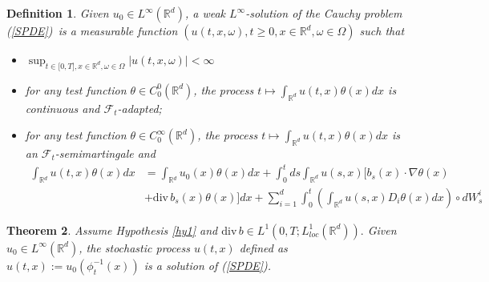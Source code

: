 \documentclass[a4paper,10pt]{article}
\newtheorem{theorem}{Theorem}
\newtheorem{definition}[theorem]{Definition}
\newtheorem{proposition}[theorem]{Proposition}
\begin{document}
\begin{definition}
\label{def solution}Given $u_{0}\in L^{\infty}({\mathbb{R}}^{d})$, a weak
$L^{\infty}$-solution of the Cauchy problem (\ref{SPDE})\ is a measurable
function $(u(t,x,\omega),t\geq0,x\in{\mathbb{R}}^{d},\omega\in\Omega)$ such that

\begin{itemize}
\item [(i)]$\sup_{t\in\lbrack0,T],x\in{\mathbb{R}}^{d},\omega\in\Omega}\left|
u(t,x,\omega)\right|  <\infty$

\item[(ii)] for any test function $\theta\in C_{0}^{0}({}{\mathbb{R}}^{d})$,
the process $t\mapsto\int_{{}{\mathbb{R}}^{d}}u(t,x)\theta(x)dx$ is continuous
and ${}\mathcal{F}_{t}$-adapted;

\item[(iii)] for any test function $\theta\in C_{0}^{\infty}({}{\mathbb{R}%
}^{d})$, the process $t\mapsto\int_{{}{\mathbb{R}}^{d}}u(t,x)\theta(x)dx$ is
an ${}\mathcal{F}_{t}$-semimartingale and
\begin{align*}
\int_{{\mathbb{R}}{}^{d}}u(t,x)\theta(x)dx  &  =\int_{{\mathbb{R}}{}^{d}}%
u_{0}(x)\theta(x)dx+\int_{0}^{t}ds\int_{{}{\mathbb{R}}^{d}}u(s,x)[b_{s}%
(x)\cdot\nabla\theta(x) \\ & +{\mathrm{div}\,}b_s(x)\theta(x)]dx
  +\sum_{i=1}^{d}\int_{0}^{t}\left(  \int_{{}{\mathbb{R}}^{d}}u(s,x)D_{i}%
\theta(x)dx\right)  \circ dW_{s}^{i}%
\end{align*}
\end{itemize}
\end{definition}



\begin{theorem}
\label{them SPDE n1} Assume  Hypothesis \ref{hy1} and $
\mathrm{div}\,  b \in L_{}^{1}\left(   0,T;
L^1_{loc}(\mathbb{R}^d)\right). $ Given $u_{0}\in
L^{\infty}({}{\mathbb{R}}^{d})$, the stochastic process $u(t,x)$
defined as $u(t,x):=u_{0}(\phi_{t}^{-1}(x))$ is a solution of
(\ref{SPDE}).
\end{theorem}
\end{document}
